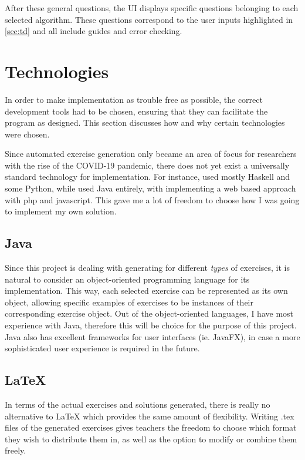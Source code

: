 \documentclass{l4proj}
\begin{document}
After these general questions, the UI displays specific questions belonging to each selected algorithm. These questions correspond to the user inputs highlighted in \autoref{sec:td} and all include guides and error checking.

\section{Technologies}

In order to make implementation as trouble free as possible, the correct development tools had to be chosen, ensuring that they can facilitate the program as designed. This section discusses how and why certain technologies were chosen.

Since automated exercise generation only became an area of focus for researchers with the rise of the COVID-19 pandemic, there does not yet exist a universally standard technology for implementation. For instance, \citet{Hoz21} used mostly Haskell and some Python, while \citet {Esh22} used Java entirely, with \citet{Kot19} implementing a web based approach with php and javascript. This gave me a lot of freedom to choose how I was going to implement my own solution. 

\subsection{Java}

Since this project is dealing with generating for different \emph{types} of exercises, it is natural to consider an object-oriented programming language for its implementation. This way, each selected exercise can be represented as its own object, allowing specific examples of exercises to be instances of their corresponding exercise object. Out of the object-oriented languages, I have most experience with Java, therefore this will be choice for the purpose of this project. Java also has excellent frameworks for user interfaces (ie. JavaFX), in case a more sophisticated user experience is required in the future.

\subsection{LaTeX}

In terms of the actual exercises and solutions generated, there is really no alternative to LaTeX which provides the same amount of flexibility. Writing .tex files of the generated exercises gives teachers the freedom to choose which format they wish to distribute them in, as well as the option to modify or combine them freely.
 
\end{document}
